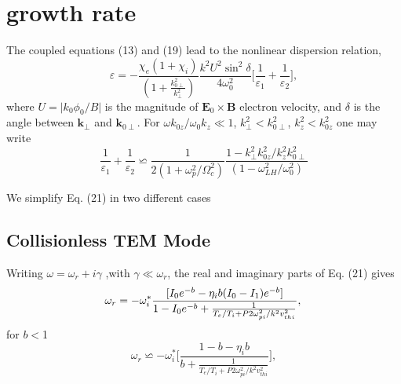 \documentclass[aip,pop,amsmath,amssymb,showpacs,reprint,floatfix,lengthcheck]{revtex4-1}
\begin{document}
\section{growth rate}
The coupled equations (13) and (19) lead to the nonlinear dispersion relation,
\begin{equation}
 \varepsilon=-\frac{\chi_{e}(1+\chi_{i})}{(1+\frac{k_{0\perp}^2}{k_{\perp}^2})}\frac{k^2 U^2 {\sin}^2 \delta}{4\omega_{0}^2}\biggl[\frac{1}{ \varepsilon_{1}}+\frac{1}{ \varepsilon_{2}}\biggr],
\end{equation}
 where
$U=\lvert{k_{0}{{\phi}_{0}}}/{B}\rvert$ is the magnitude of $\textbf{E}_{0}\times \textbf{B}$ electron velocity, and $\delta$ is the angle between $\textbf{k}_{\perp}$ and $\textbf{k}_{0\perp}$. For ${\omega k_{0z}}/{\omega_{0}k_{z}} \ll1$, $k_{\perp}^2<k_{0\perp}^2$, $k_{z}^2<k_{0z}^2$ one may write 
\begin{equation}
 \frac{1}{\varepsilon_{1}}+\frac{1}{\varepsilon_{2}}\backsimeq\frac{1}{2(1+\omega_{p}^2/\Omega_{c}^2)}\frac{1-k_{\perp}^2k_{0z}^2/k_{z}^2k_{0\perp}^2}{(1-\omega_{LH}^2/\omega_{0}^2)}
\end{equation}

We simplify Eq. (21) in two different cases 
\subsection{Collisionless TEM Mode}
Writing $\omega=\omega_{r}+i\gamma$ ,with $\gamma\ll \omega_{r}$,  the real and imaginary parts  of Eq. (21)  gives 
\begin{equation}
 \omega_{r}=-\omega_{i}^*\frac{[I_{0}e^{-b}-\eta_{i}b(I_{0}-I_{1})e^{-b}]}{1-I_{0}e^{-b}+\frac{1}{T_{e}/T_{i}+P2\omega_{pi}^2/k^2v_{thi}^2}},\nonumber\\
\end{equation}
for $b<$1 
\begin{equation}
 \omega_{r}\backsimeq-\omega_{i}^*\biggl[\frac{1-b-\eta_{i}b}{b+\frac{1}{T_{e}/T_{i}+P2\omega_{pi}^2/k^2v_{thi}^2}}\biggr],
\end{equation}
\end{document}
